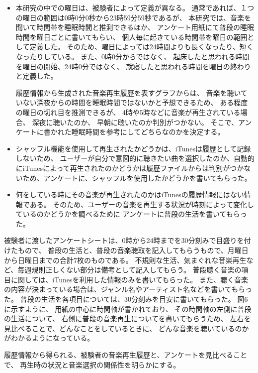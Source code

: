 \documentclass[11pt, onecolumn]{jsarticle}
\begin{document}
\begin{itemize}

\item
本研究の中での曜日は、被験者によって定義が異なる。
通常であれば、１つの曜日の範囲は0時0分0秒から23時59分59秒であるが、
本研究では、音楽を聞いて時間帯を睡眠時間と推測できるほか、
アンケート用紙にて普段の睡眠時間を曜日ごとに書いてもらい、
個人毎に起きている時間帯を曜日の範囲として定義した。
そのため、曜日によっては24時間よりも長くなったり、短くなったりしている。
また、0時0分からではなく、
起床したと思われる時間を曜日の開始、24時0分ではなく、
就寝したと思われる時間を曜日の終わりと定義した。

履歴情報から生成された音楽再生履歴を表すグラフからは、
音楽を聴いていない深夜からの時間を睡眠時間ではないかと予想できるため、
ある程度の曜日の切れ目を推測できるが、
4時や5時などに音楽が再生されている場合、
深夜に聴いたのか、
早朝に聴いたのか判別がつかない。
そこで、アンケートに書かれた睡眠時間を参考にしてどちらなのかを決定する。
\item
シャッフル機能を使用して再生されたかどうかは、iTunesは履歴として記録しないため、
ユーザーが自分で意図的に聴きたい曲を選択したのか、自動的にiTunesによって再生されたのかどうかは履歴ファイルからは判別がつかないため、アンケートに、シャッフルを使用したかどうかを書いてもらった。
\item
何をしている時にその音楽が再生されたのかはiTunesの履歴情報にはない情報である。
そのため、ユーザーの音楽を再生する状況が時刻によって変化しているのかどうかを調べるために
アンケートに普段の生活を書いてもらった。
\end{itemize}


被験者に渡したアンケートシートは、0時から24時までを30分刻みで目盛りを付けたもので、
普段の生活と、普段の音楽聴取を記入してもらうもので、月曜日から日曜日までの合計7枚のものである。
不規則な生活、気まぐれな音楽再生など、毎週規則正しくない部分は備考として記入してもらう。
普段聴く音楽の項目に関しては、iTunesを利用した情報のみを書いてもらった。
また、聴く音楽の内容が決まっている場合は、ジャンル名やアーティスト名などを書いてもらった。
普段の生活を各項目については、30分刻みを目安に書いてもらった。
図6に示すように、%
用紙の中心に時間軸が書かれており、
その時間軸の左側に普段の生活について、
右側に普段の音楽再生についてを書いてもらうため、
左右を見比べることで、どんなことをしているときに、
どんな音楽を聴いているのかがわかるようになっている。

履歴情報から得られる、被験者の音楽再生履歴と、アンケートを見比べることで、
再生時の状況と音楽選択の関係性を明らかにする。
\end{document}

